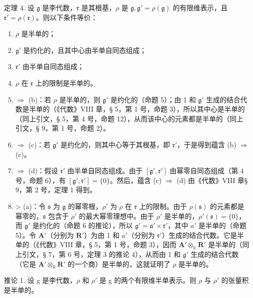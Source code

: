 定理 4. 设 \(\mathfrak{g}\) 是李代数，\(\mathfrak{r}\) 是其根基，\(\rho\) 是 \(\mathfrak{g},\mathfrak{g}' = \rho (\mathfrak{g})\) 的有限维表示，且 \(\mathfrak{r}' = \rho (\mathfrak{r})\)。则以下条件等价：

\begin{enumerate}
\def\labelenumi{(\alph{enumi})}
\item
  \(\rho\) 是半单的；
\item
  \(\mathfrak{g}'\) 是约化的，且其中心由半单自同态组成；
\item
  \(\mathfrak{r}'\) 由半单自同态组成；
\item
  \(\rho\) 在 \(\mathfrak{r}\) 上的限制是半单的。
\item
  \(\Rightarrow\) (b)：若 \(\rho\) 是半单的，则 \(\mathfrak{g}'\) 是约化的（命题 5）；由 1 和 \(\mathfrak{g}'\) 生成的结合代数是半单的（《代数》VIII 章，§ 5，第 1 号，命题 3），所以其中心是半单的（同上引文，§ 5，第 4 号，命题 12），从而该中心的元素都是半单的（同上引文，§ 9，第 1 号，命题 2）。
\item
  \(\Rightarrow\) (c)：若 \(\mathfrak{g}'\) 是约化的，则其中心等于其根基，即 \(\mathfrak{r}'\)，于是得到蕴含 (b) \(\Rightarrow\) (c)。
\item
  \(\Rightarrow\) (d)：假设 \(\mathfrak{r}'\) 由半单自同态组成。由于 \([\mathfrak{g}',\mathfrak{r}']\) 由幂零自同态组成（第 4 号，命题 6），有 \([\mathfrak{g}',\mathfrak{r}'] = \{0\}\)。然后，蕴含 (c) \(\Rightarrow\) (d) 由《代数》VIII 章§ 9，第 2 号，定理 1 得到。
\item
  \textgreater{} (a)：令 \(\mathfrak{s}\) 为 \(\mathfrak{g}\) 的幂零根，\(\rho'\) 为 \(\rho\) 在 \(\mathfrak{r}\) 上的限制。由于 \(\rho(\mathfrak{s})\) 的元素都是幂零的，\(\mathfrak{s}\) 包含于 \(\rho'\) 的最大幂零理想中。由于 \(\rho'\) 是半单的，\(\rho'(\mathfrak{s}) = \{0\}\)，而 \(\mathfrak{g}'\) 是约化的（命题 6 的推论），所以 \(\mathfrak{g}' = \mathfrak{a}' \times \mathfrak{r}'\)，其中 \(a'\) 是半单的（命题 5）。令 \(\mathbf{A}'\)（分别为 \(\mathbf{R}'\)）为由 1 和 \(a'\)（分别为 \(\mathfrak{r}'\)）生成的结合代数。它是半单的（《代数》VIII 章，§ 5，第 1 号，命题 3），因而 \(\mathbf{A}' \otimes_{\mathbb{K}} \mathbf{R}'\) 是半单的（同上引文，§ 7，第 6 号，定理 3 的推论 4），从而由 1 和 \(\mathfrak{g}'\) 生成的结合代数（它是 \(\mathbf{A}' \otimes_{\mathbb{K}} \mathbf{R}'\) 的一个商）是半单的，这就证明了 \(\rho\) 是半单的。
\end{enumerate}

推论 1. 设 g 是李代数，\(\rho\) 和 \(\rho'\) 是 g 的两个有限维半单表示。则 \(\rho\) 与 \(\rho'\) 的张量积是半单的。

